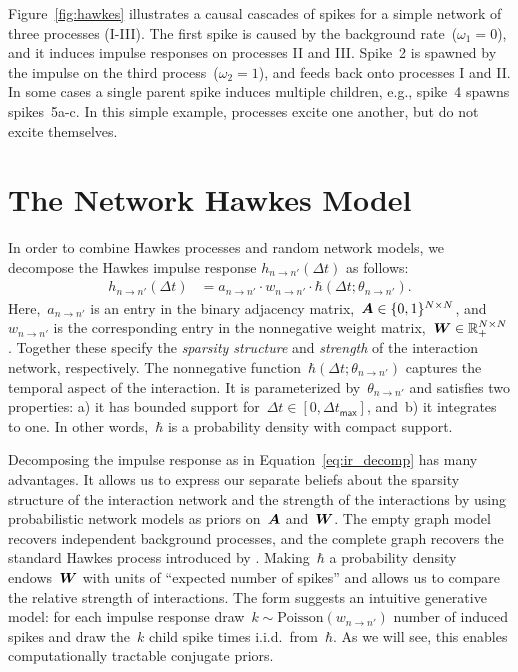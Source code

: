 Figure~\ref{fig:hawkes} illustrates a causal cascades of spikes for a
simple network of three processes (I-III).  The first spike is caused
by the background rate~(${\omega_1=0}$), and it induces impulse responses
on processes II and III. Spike~2 is spawned by the impulse on the
third process~(${\omega_2=1}$), and feeds back onto processes I and II. In
some cases a single parent spike induces multiple children, e.g.,
spike~4 spawns spikes~{5a-c}. In this simple example, processes excite
one another, but do not excite themselves.

\section{The Network Hawkes Model}
\label{sec:network_hawkes_model}
In order to combine Hawkes processes and random network models, we
decompose the Hawkes impulse response $h_{n \to n'}(\Delta t)$ as
follows:
\begin{align}
\label{eq:ir_decomp}
h_{n \to n'}(\Delta t) &= a_{n \to n'} \cdot w_{n \to n'} \cdot \hbar(\Delta t; \theta_{n \to n'}).
\end{align}
Here,~$a_{n \to n'}$ is an entry in the binary adjacency
matrix,~${\boldsymbol{A}\in\{0,1\}^{N \times N}}$,
and~$w_{n \to n'}$ is the corresponding entry in the nonnegative
weight matrix,~${\boldsymbol{W} \in\mathbb{R}_+^{N\times N}}$. Together these specify
the \emph{sparsity structure} and \emph{strength} of the interaction
network, respectively. The nonnegative function~${\hbar(\Delta t;
  \theta_{n \to n'})}$ captures the temporal aspect of the
interaction. It is parameterized by~${\theta_{n \to n'}}$ and
satisfies two properties: a) it has bounded support for~${\Delta t \in
  [0,\Delta t_{\mathsf{max}}]}$, and~b) it integrates to one. In other
words,~$\hbar$ is a probability density with compact support.

Decomposing the impulse response as in Equation~\ref{eq:ir_decomp} has
many advantages. It allows us to express our separate beliefs about
the sparsity structure of the interaction network and the strength of
the interactions by using probabilistic network models as priors
on~$\boldsymbol{A}$ and~$\boldsymbol{W}$.  The empty graph model recovers independent
background processes, and the complete graph recovers the standard
Hawkes process introduced by \citet{Hawkes-1971}.  Making~$\hbar$ a
probability density endows~$\boldsymbol{W}$ with units of ``expected number of
spikes'' and allows us to compare the relative strength of
interactions. The form suggests an intuitive generative model: for
each impulse response draw~${k \sim \text{Poisson}(w_{n \to n'})}$
number of induced spikes and draw the~$k$ child spike times
i.i.d.\ from~$\hbar$.  
As we will see, this enables computationally
tractable conjugate priors.


